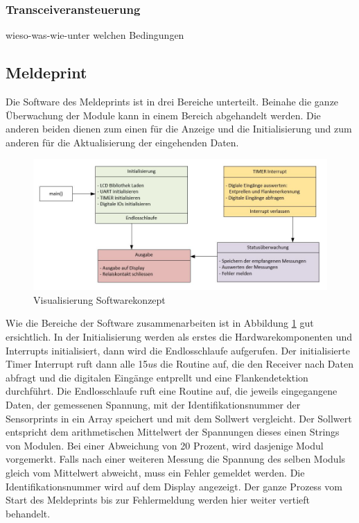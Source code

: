 \subsubsection{Transceiveransteuerung}
wieso-was-wie-unter welchen Bedingungen
\subsection{Meldeprint}
Die Software des Meldeprints ist in drei Bereiche unterteilt. Beinahe die ganze Überwachung der Module kann in einem Bereich abgehandelt werden. Die anderen beiden dienen zum einen für die Anzeige und die Initialisierung und zum anderen für die Aktualisierung der eingehenden Daten.

\begin{figure}[htbp] 
  \centering
     \includegraphics[width=1\textwidth]{graphics/reportboard-software-river}
  \caption{Visualisierung Softwarekonzept}
  \label{fig:reportboard-software-river}
\end{figure}

Wie die Bereiche der Software zusammenarbeiten ist in Abbildung \ref{fig:reportboard-software-river} gut ersichtlich. In der Initialisierung werden als erstes die Hardwarekomponenten und Interrupts initialisiert, dann wird die Endlosschlaufe aufgerufen.
\newline
Der initialisierte Timer Interrupt ruft dann alle 15$u$s die Routine auf, die den Receiver nach Daten abfragt und die digitalen Eingänge entprellt und eine Flankendetektion durchführt.
\newline
\newline
Die Endlosschlaufe ruft eine Routine auf, die jeweils eingegangene Daten, der gemessenen Spannung, mit der Identifikationsnummer der Sensorprints in ein Array speichert und mit dem Sollwert vergleicht. Der Sollwert entspricht dem arithmetischen Mittelwert der Spannungen dieses einen Strings von Modulen. Bei einer Abweichung von 20 Prozent, wird dasjenige Modul vorgemerkt. Falls nach einer weiteren Messung die Spannung des selben Moduls gleich vom Mittelwert abweicht, muss ein Fehler gemeldet werden. Die Identifikationsnummer wird auf dem Display angezeigt. Der ganze Prozess vom Start des Meldeprints bis zur Fehlermeldung werden hier weiter vertieft behandelt.
